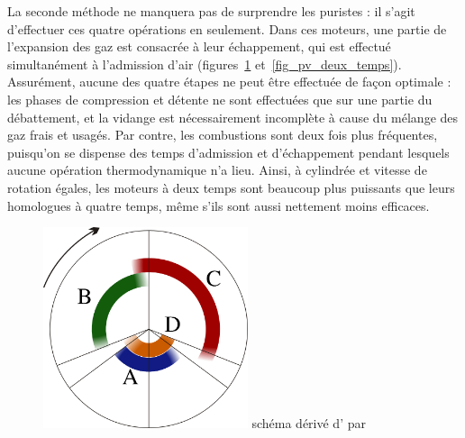 	La seconde méthode ne manquera pas de surprendre les puristes : il s’agit d’effectuer ces quatre opérations en  seulement. Dans ces moteurs, une partie de l’expansion des gaz est consacrée à leur échappement, qui est effectué simultanément à l’admission d’air (figures~\ref{fig_cycle_deux_temps} et~\ref{fig_pv_deux_temps}). Assurément, aucune des quatre étapes ne peut être effectuée de façon optimale : les phases de compression et détente ne sont effectuées que sur une partie du débattement, et la vidange est nécessairement incomplète à cause du mélange des gaz frais et usagés. Par contre, les combustions sont deux fois plus fréquentes, puisqu’on se dispense des temps d’admission et d’échappement pendant lesquels aucune opération thermodynamique n’a lieu. Ainsi, à cylindrée et vitesse de rotation égales, les moteurs à deux temps sont beaucoup plus puissants que leurs homologues à quatre temps, même s’ils sont aussi nettement moins efficaces.
	
	\begin{figure}
		\begin{center}
			\includegraphics[width=6cm]{images/cycle_deux_temps.png}
			{schéma dérivé d’ \ccbysa par }
			\label{fig_cycle_deux_temps}
		\end{center}
	\end{figure}	
	
